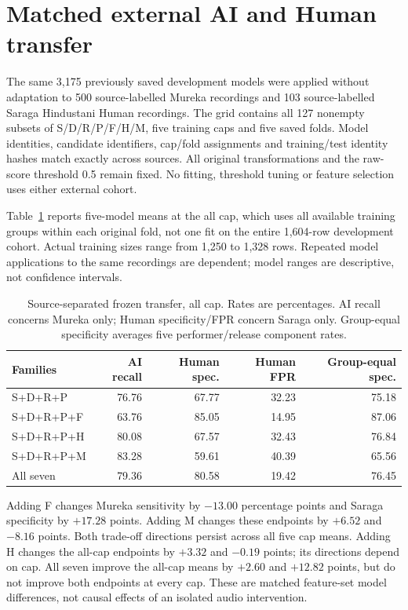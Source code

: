 \section{Matched external AI and Human transfer}
\label{sec:saraga-mureka-frozen-transfer}

The same 3,175 previously saved development models were applied without
adaptation to 500 source-labelled Mureka recordings and 103 source-labelled
Saraga Hindustani Human recordings. The grid contains all 127 nonempty subsets
of S/D/R/P/F/H/M, five training caps and five saved folds. Model identities,
candidate identifiers, cap/fold assignments and training/test identity hashes
match exactly across sources. All original transformations and the raw-score
threshold 0.5 remain fixed. No fitting, threshold tuning or feature selection
uses either external cohort.

Table~\ref{tab:saraga-mureka-allcap} reports five-model means at the all cap,
which uses all available training groups within each original fold, not one
fit on the entire 1,604-row development cohort. Actual training sizes range
from 1,250 to 1,328 rows. Repeated model applications to the same recordings
are dependent; model ranges are descriptive, not confidence intervals.

\begin{table}[htbp]
\centering
\small
\begin{tabular}{lrrrr}
\toprule
Families & AI recall & Human spec. & Human FPR & Group-equal spec. \\
\midrule
S+D+R+P & 76.76 & 67.77 & 32.23 & 75.18 \\
S+D+R+P+F & 63.76 & 85.05 & 14.95 & 87.06 \\
S+D+R+P+H & 80.08 & 67.57 & 32.43 & 76.84 \\
S+D+R+P+M & 83.28 & 59.61 & 40.39 & 65.56 \\
All seven & 79.36 & 80.58 & 19.42 & 76.45 \\
\bottomrule
\end{tabular}
\caption{Source-separated frozen transfer, all cap. Rates are percentages.
AI recall concerns Mureka only; Human specificity/FPR concern Saraga only.
Group-equal specificity averages five performer/release component rates.}
\label{tab:saraga-mureka-allcap}
\end{table}

Adding F changes Mureka sensitivity by $-13.00$ percentage points and Saraga
specificity by $+17.28$ points. Adding M changes these endpoints by $+6.52$ and
$-8.16$ points. Both trade-off directions persist across all five cap means.
Adding H changes the all-cap endpoints by $+3.32$ and $-0.19$ points; its
directions depend on cap. All seven improve the all-cap means by $+2.60$ and
$+12.82$ points, but do not improve both endpoints at every cap. These are
matched feature-set model differences, not causal effects of an isolated
audio intervention.

